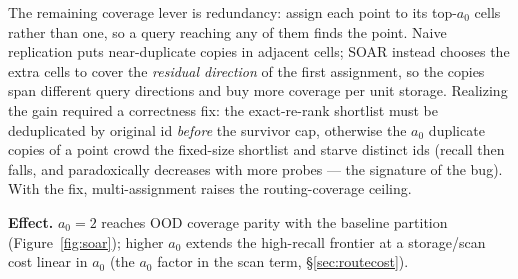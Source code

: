 \documentclass{article}
\newcommand{\effect}[1]{\par\smallskip\noindent\textbf{Effect.} #1}
\begin{document}
\label{sec:soar}
The remaining coverage lever is redundancy: assign each point to its top-$a_0$ cells
rather than one, so a query reaching any of them finds the point. Naive replication
puts near-duplicate copies in adjacent cells; SOAR instead chooses the extra cells to
cover the \emph{residual direction} of the first assignment, so the copies span
different query directions and buy more coverage per unit storage. Realizing the gain
required a correctness fix: the exact-re-rank shortlist must be deduplicated by
original id \emph{before} the survivor cap, otherwise the $a_0$ duplicate copies of a
point crowd the fixed-size shortlist and starve distinct ids (recall then falls, and
paradoxically decreases with more probes --- the signature of the bug). With the fix,
multi-assignment raises the routing-coverage ceiling.
\effect{$a_0{=}2$ reaches OOD coverage parity with the baseline partition (Figure~\ref{fig:soar}); higher
$a_0$ extends the high-recall frontier at a storage/scan cost linear in $a_0$
(the $a_0$ factor in the scan term, \S\ref{sec:routecost}).}
\end{document}

